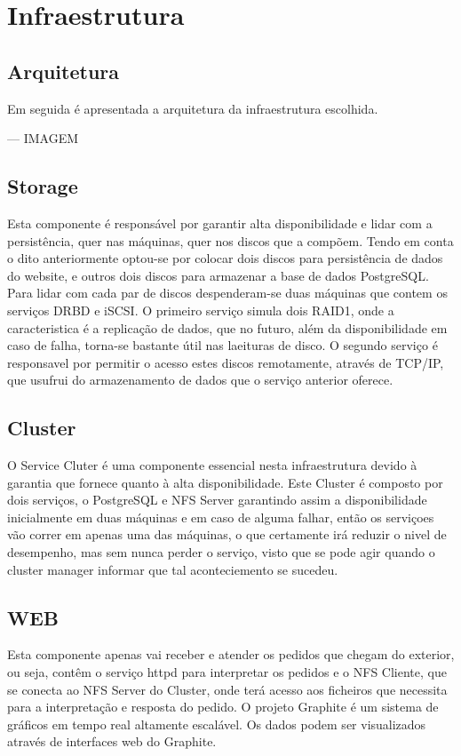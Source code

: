 \section{Infraestrutura}

\subsection{Arquitetura}

Em seguida é apresentada a arquitetura da infraestrutura escolhida.

--- IMAGEM

\subsection{Storage}
Esta componente é responsável por garantir alta disponibilidade e lidar com a persistência, quer nas máquinas, quer nos discos que a compõem. Tendo em conta o dito anteriormente optou-se por colocar dois discos para persistência de dados do website, e outros dois discos para armazenar a base de dados PostgreSQL. Para lidar com cada par de discos despenderam-se duas máquinas que contem os serviços DRBD e iSCSI. O primeiro serviço simula dois RAID1, onde a caracteristica é a replicação de dados, que no futuro, além da disponibilidade em caso de falha, torna-se bastante útil nas laeituras de disco. O segundo serviço é responsavel por permitir o acesso estes discos remotamente, através de TCP/IP, que usufrui do armazenamento de dados que o serviço anterior oferece.

\subsection{Cluster}
O Service Cluter é uma componente essencial nesta infraestrutura devido à garantia que fornece quanto à alta disponibilidade. Este Cluster é composto por dois serviços, o PostgreSQL e NFS Server garantindo assim a disponibilidade inicialmente em duas máquinas e em caso de alguma falhar, então os serviçoes vão correr em apenas uma das máquinas, o que certamente irá reduzir o nivel de desempenho, mas sem nunca perder o serviço, visto que se pode agir quando o cluster manager informar que tal aconteciemento se sucedeu.

\subsection{WEB}
Esta componente apenas vai receber e atender os pedidos que chegam do exterior, ou seja, contêm o serviço httpd para interpretar os pedidos e o NFS Cliente, que se conecta ao NFS Server do Cluster, onde terá acesso aos ficheiros que necessita para a interpretação e resposta do pedido.
O projeto Graphite é um sistema de gráficos em tempo real altamente escalável. Os dados podem ser visualizados através de interfaces web do Graphite.

